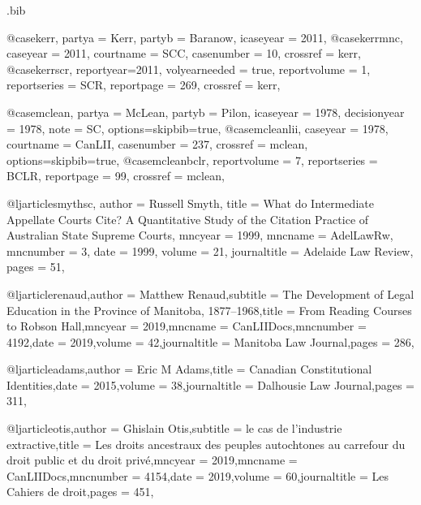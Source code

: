 \begin{filecontents*}{\jobname.bib}

@case{kerr,
  partya = {Kerr}, 
  partyb = {Baranow},
  icaseyear = {2011},
  }
@case{kerrmnc,
  caseyear = {2011},
  courtname = {SCC},
  casenumber = {10},
  crossref = {kerr},
  }
@case{kerrscr,
  reportyear={2011},
  volyearneeded = {true},
  reportvolume = {1},
  reportseries = {SCR},
  reportpage = {269},
  crossref = {kerr},
  	}





@case{mclean,
  partya = {McLean}, 
  partyb = {Pilon},
  icaseyear = {1978},
  decisionyear = {1978},
  note = {SC},
  options={skipbib=true},
  }
@case{mcleanlii,
  caseyear = {1978},
  courtname = {CanLII},
  casenumber = {237},
  crossref = {mclean},
  options={skipbib=true},
  }
@case{mcleanbclr,
  reportvolume = {7},
  reportseries = {BCLR},
  reportpage = {99},
  crossref = {mclean},
  	}








@ljarticle{smythsc,
author = {Russell Smyth},
title = {What do Intermediate Appellate Courts Cite? A Quantitative Study of the Citation Practice of Australian State Supreme Courts},
mncyear = {1999},
mncname = {AdelLawRw},
mncnumber = {3},
date = {1999},
volume = {21},
journaltitle = {Adelaide Law Review},
pages = {51},
}

@ljarticle{renaud,author = {Matthew Renaud},subtitle = {The Development of Legal Education in the Province of Manitoba, 1877–1968},title = {From Reading Courses to Robson Hall},mncyear = {2019},mncname = {CanLIIDocs},mncnumber = {4192},date = {2019},volume = {42},journaltitle = {Manitoba Law Journal},pages = {286},}

@ljarticle{adams,author = {Eric M Adams},title = {Canadian Constitutional Identities},date = {2015},volume = {38},journaltitle = {Dalhousie Law Journal},pages = {311},}

@ljarticle{otis,author = {Ghislain Otis},subtitle = {le cas de l’industrie extractive},title = {Les droits ancestraux des peuples autochtones au carrefour du droit public et du droit privé},mncyear = {2019},mncname = {CanLIIDocs},mncnumber = {4154},date = {2019},volume = {60},journaltitle = {Les Cahiers de droit},pages = {451},}


\end{filecontents*}
